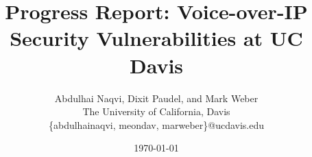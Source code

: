 \documentclass[letterpaper,twocolumn,10pt]{article}
\begin{document}
\title{ Progress Report: Voice-over-IP Security Vulnerabilities at UC Davis}
  \date{ \today }
  \author{Abdulhai Naqvi, Dixit Paudel, and Mark Weber\\
  The University of California, Davis\\
  \{abdulhainaqvi, meondav, marweber\}@ucdavis.edu}

\maketitle






\appendix


\end{document}

